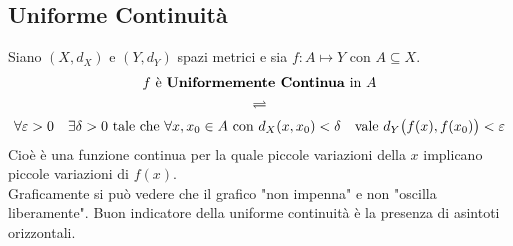 \subsection{Uniforme Continuità}
\begin{definition}
	\label{def:funz_unif_cont}
	Siano $(X,d_X)$ e $(Y,d_Y)$ spazi metrici e sia $f:A \mapsto Y$ con $A \subseteq X$.
	\begin{equation*}
		\begin{gathered}
			f \text{ è \textbf{Uniformemente Continua} in } A\\
			\rightleftharpoons\\
			\forall \varepsilon > 0 \quad \exists \delta > 0 \text{ tale che } \forall x,x_0 \in A \text{ con } d_X(x,x_0) < \delta \quad \text{vale } d_Y\bigl(f(x),f(x_0)\bigr) < \varepsilon
		\end{gathered}
	\end{equation*}
	Cioè è una funzione continua per la quale piccole variazioni della $x$ implicano piccole variazioni di $f(x)$.\\
	Graficamente si può vedere che il grafico "non impenna" e non "oscilla liberamente". Buon indicatore della uniforme continuità è la presenza di asintoti orizzontali.
\end{definition}

